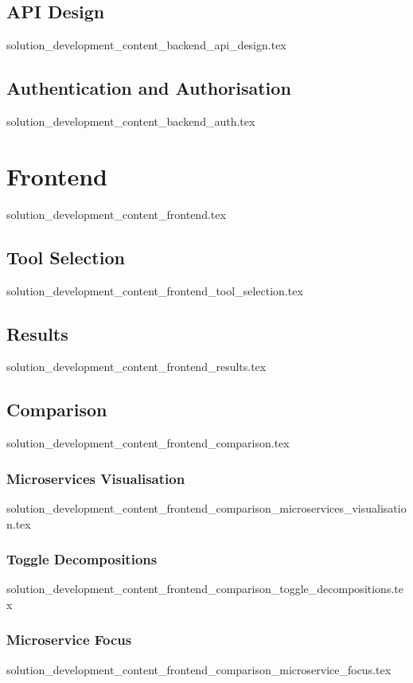 \subsection{API Design}
  {solution_development_content_backend_api_design.tex}
\subsection{Authentication and Authorisation}\label{sub:backend_auth}
  {solution_development_content_backend_auth.tex}

\section{Frontend}\label{sub:frontend}
  {solution_development_content_frontend.tex}
\subsection{Tool Selection}\label{sub:frontend_tool_selection}
  {solution_development_content_frontend_tool_selection.tex}
\subsection{Results}\label{sub:frontend_results}
  {solution_development_content_frontend_results.tex}
\subsection{Comparison}\label{sub:frontend_comparison}
  {solution_development_content_frontend_comparison.tex}

  \subsubsection{Microservices Visualisation}\label{sub:frontend_comparison_microservices_visualisation}
    {solution_development_content_frontend_comparison_microservices_visualisation.tex}
  \subsubsection{Toggle Decompositions}\label{sub:frontend_comparison_toggle_decompositions}
    {solution_development_content_frontend_comparison_toggle_decompositions.tex}
  \subsubsection{Microservice Focus}\label{sub:frontend_comparison_microservice_focus}
    {solution_development_content_frontend_comparison_microservice_focus.tex}
